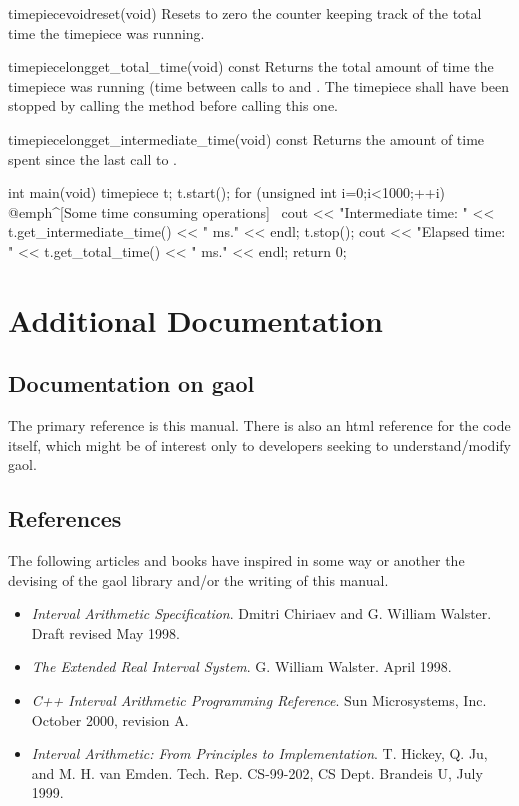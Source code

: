\documentclass{manual}
\begin{document}
\begin{defmethod}{timepiece}{void}{reset}{(void)}
  Resets to zero the counter keeping track of the total time the timepiece was running.
\end{defmethod}

\begin{defmethod}{timepiece}{long}{get\_total\_time}{(void) const}
  Returns the total amount of time the timepiece was running (time between calls to
   and . The timepiece shall have been stopped by calling the
   method before calling this one.
\end{defmethod}

\begin{defmethod}{timepiece}{long}{get\_intermediate\_time}{(void) const}
  Returns the amount of time spent since the last call to .
\end{defmethod}


\begin{example}
int main(void)
{
  timepiece t;
  t.start();
  for (unsigned int i=0;i<1000;++i) {
     @emph^[Some time consuming operations]~
     cout << "Intermediate time: "
          << t.get_intermediate_time() << " ms." << endl;
  }
  t.stop();
  cout << "Elapsed time: " << t.get_total_time() << " ms." << endl;
  return 0;
}
\end{example}


\chapter{Additional Documentation}

\section{Documentation on gaol}

The primary reference is this manual. There is also an html reference
for the code itself, which might be of interest only to developers
seeking to understand/modify gaol.

\section{References}
The following articles and books have inspired in some way or another the
devising of the gaol library and/or the writing of this manual.

\begin{itemize}
\item \emph{Interval Arithmetic Specification}. Dmitri Chiriaev and G.\:
William Walster. Draft revised May 1998.
\item \emph{The Extended Real Interval System}. G.\: William
Walster. April 1998.
\item \emph{C++ Interval Arithmetic Programming Reference}. Sun Microsystems,
Inc. October 2000, revision A.
\item \emph{Interval Arithmetic: From Principles to Implementation}. T.\:
Hickey, Q.\: Ju, and M.\: H.\: van Emden. Tech. Rep. CS-99-202,
CS Dept. Brandeis U, July 1999.
\end{itemize}
\end{document}
